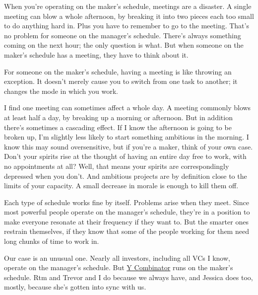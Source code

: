 When
                    you're operating on the maker's schedule, meetings are a
                    disaster. A single meeting can blow a whole afternoon, by
                    breaking it into two pieces each too small to do anything
                    hard in. Plus you have to remember to go to the meeting.
                    That's no problem for someone on the manager's schedule.
                    There's always something coming on the next hour; the only
                    question is what. But when someone on the maker's schedule
                    has a meeting, they have to think about it.

For
                    someone on the maker's schedule, having a meeting is like
                    throwing an exception. It doesn't merely cause you to switch
                    from one task to another; it changes the mode in which you
                    work.

I find one meeting can sometimes affect a
                    whole day. A meeting commonly blows at least half a day, by
                    breaking up a morning or afternoon. But in addition there's
                    sometimes a cascading effect. If I know the afternoon is
                    going to be broken up, I'm slightly less likely to start
                    something ambitious in the morning. I know this may sound
                    oversensitive, but if you're a maker, think of your own
                    case. Don't your spirits rise at the thought of having an
                    entire day free to work, with no appointments at all? Well,
                    that means your spirits are correspondingly depressed when
                    you don't. And ambitious projects are by definition close to
                    the limits of your capacity. A small decrease in morale is
                    enough to kill them off.

Each type of schedule
                    works fine by itself. Problems arise when they meet. Since
                    most powerful people operate on the manager's schedule,
                    they're in a position to make everyone resonate at their
                    frequency if they want to. But the smarter ones restrain
                    themselves, if they know that some of the people working for
                    them need long chunks of time to work in.

Our
                    case is an unusual one. Nearly all investors, including all
                    VCs I know, operate on the manager's schedule. But
                    \href{http://ycombinator.com}{Y Combinator}
                    runs on the maker's schedule. Rtm and Trevor and I do
                    because we always have, and Jessica does too, mostly,
                    because she's gotten into sync with us.

